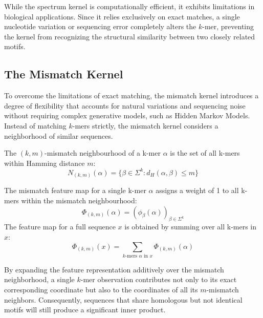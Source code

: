 While the spectrum kernel is computationally efficient, it exhibits limitations in biological applications. Since it relies exclusively on exact matches, a single nucleotide variation or sequencing error completely alters the $k$-mer, preventing the kernel from recognizing the structural similarity between two closely related motifs.

\subsection{The Mismatch Kernel}\label{sec:mismatch-kernel}

To overcome the limitations of exact matching, the mismatch kernel introduces a degree of flexibility that accounts for natural variations and sequencing noise without requiring complex generative models, such as Hidden Markov Models. Instead of matching $k$-mers strictly, the mismatch kernel considers a neighborhood of similar sequences.

\begin{definizione}\label{def:mismatch-neighbourhood}
The $(k,m)$-mismatch neighbourhood of a k-mer $\alpha$ is the set of all k-mers within Hamming distance $m$:
\begin{equation}\label{eq:mismatch-neighbourhood}
N_{(k,m)}(\alpha) = \{ \beta \in \Sigma^k : d_H(\alpha, \beta) \leq m \}
\end{equation}
\end{definizione}

\begin{definizione}\label{def:mismatch-feature-map}
The mismatch feature map for a single k-mer $\alpha$ assigns a weight of 1 to all k-mers within the mismatch neighbourhood:
\begin{equation}\label{eq:mismatch-feature-kmer}
\Phi_{(k,m)}(\alpha) = (\phi_{\beta}(\alpha))_{\beta \in \Sigma^k}
\end{equation}
The feature map for a full sequence $x$ is obtained by summing over all k-mers in $x$:
\begin{equation}\label{eq:mismatch-feature-seq}
\Phi_{(k,m)}(x) = \sum_{k\text{-mers } \alpha \text{ in } x} \Phi_{(k,m)}(\alpha)
\end{equation}
\end{definizione}

By expanding the feature representation additively over the mismatch neighborhood, a single $k$-mer observation contributes not only to its exact corresponding coordinate but also to the coordinates of all its $m$-mismatch neighbors. Consequently, sequences that share homologous but not identical motifs will still produce a significant inner product.

